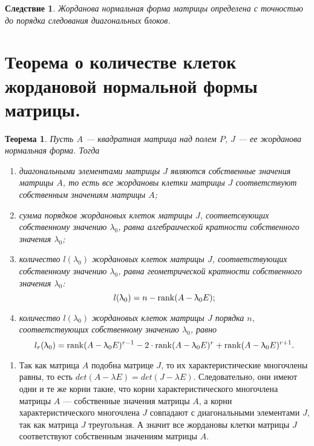 \newtheorem*{cor12_8_3}{Следствие}\begin{cor12_8_3}Жорданова нормальная форма матрицы определена с точностью до порядка следования диагональных блоков.
\end{cor12_8_3}













\section{Теорема о количестве клеток жордановой нормальной формы матрицы.}

\newtheorem*{th12_9}{Теорема}\begin{th12_9}Пусть $A$ --- квадратная матрица над полем $P$, $J$ --- ее жорданова нормальная форма. Тогда\begin{enumerate}
		\item диагональными элементами матрицы $J$ являются собственные значения матрицы $A$, то есть все жордановы клетки матрицы $J$ соответствуют собственным значениям матрицы $A$;
		\item сумма порядков жордановых клеток матрицы $J$, соответсвующих собственному значению $\lambda_0$, равна алгебраической кратности собственного значения $\lambda_0$;
		\item количество $l(\lambda_0)$ жордановых клеток матрицы $J$, соответствующих собственному значению $\lambda_0$, равна геометрической кратности собственного значения $\lambda_0$: $$l(\uplambda_0) = n - \operatorname{rank} (A - \uplambda_0 E);$$
		\item количество $l(\lambda_0)$ жордановых клеток матрицы $J$ порядка $n$, соответствующих собственному значению $\lambda_0$, равно $$l_r(\uplambda_0) = \operatorname{rank} (A - \uplambda_0 E)^{r - 1} - 2\cdot \operatorname{rank} (A - \uplambda_0 E)^{r} + \operatorname{rank} (A - \uplambda_0 E)^{r + 1}.$$
	\end{enumerate}
\end{th12_9}\begin{Proof}\begin{enumerate}
		\item Так как матрица $A$ подобна матрице $J$, то их характеристические многочлены равны, то есть $det(A - \lambda E) = det(J - \lambda E)$. Следовательно, они имеют одни и те же корни такие, что корни характеристического многочлена матрицы $A$ --- собственные значения матрицы $A$, а корни характеристического многочлена $J$ совпадают с диагональными элементами $J$, так как матрица $J$ треугольная. А значит все жордановы клетки матрицы $J$ соответствуют собственным значениям матрицы $A$.

\end{enumerate}
\end{Proof}
